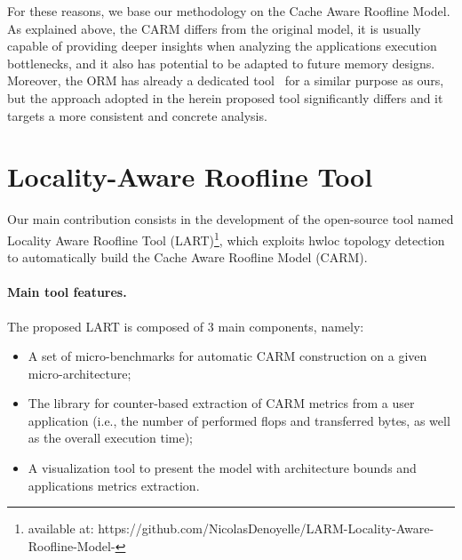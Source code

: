 \documentclass[twoside,twocolumn,8pt]{extarticle}
\begin{document}
For these reasons, we base our methodology on the Cache Aware Roofline Model. 
As explained above, the CARM differs from the original model, it is usually capable of providing deeper insights when analyzing the
applications execution bottlenecks, and it also has potential to be adapted to future memory designs. Moreover, the ORM has already
a dedicated tool~\cite{Lo2015} for a similar purpose as ours, but the approach adopted in the herein proposed tool significantly
differs and it targets a more consistent and concrete analysis.

\section{Locality-Aware Roofline Tool}\label{sec:contrib}

Our main contribution consists in the development of the open-source tool named Locality Aware Roofline Tool (LART)\footnote{available at: https://github.com/NicolasDenoyelle/LARM-Locality-Aware-Roofline-Model-}, which
exploits hwloc topology detection to automatically build the Cache Aware Roofline Model (CARM).

\paragraph*{Main tool features.}

The proposed LART is composed of 3 main components, namely:
\begin{itemize}
\item A set of micro-benchmarks for automatic CARM construction on a given micro-architecture;
\item The library for counter-based extraction  of CARM metrics from a user application (i.e., the number of performed flops and
  transferred bytes, as well as the overall execution time);
\item A visualization tool to present the model with architecture bounds and applications metrics extraction.
\end{itemize}
\end{document}
